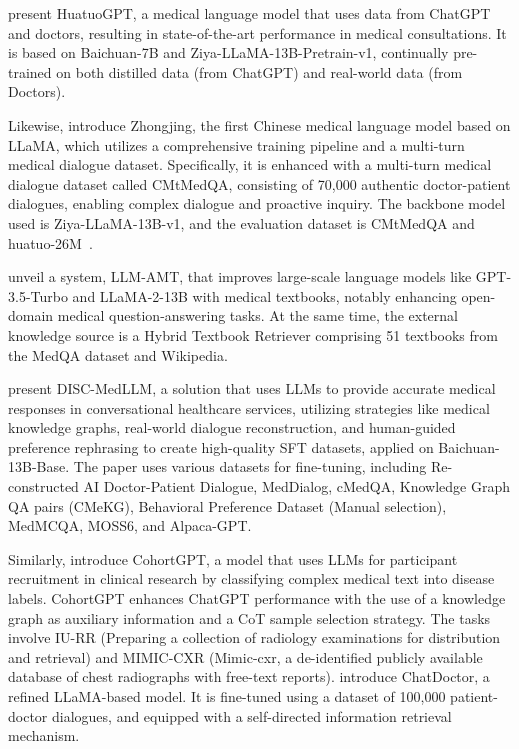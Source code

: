 \citet{zhang2023huatuogpt} present HuatuoGPT, a medical language model that uses data from ChatGPT and doctors, resulting in state-of-the-art performance in medical consultations. It is based on Baichuan-7B and Ziya-LLaMA-13B-Pretrain-v1, continually pre-trained on both distilled data (from ChatGPT) and real-world data (from Doctors). 

Likewise, \citet{yang2023zhongjing} introduce Zhongjing, the first Chinese medical language model based on LLaMA, which utilizes a comprehensive training pipeline and a multi-turn medical dialogue dataset. Specifically, it is enhanced with a multi-turn medical dialogue dataset called CMtMedQA, consisting of 70,000 authentic doctor-patient dialogues, enabling complex dialogue and proactive inquiry. The backbone model used is Ziya-LLaMA-13B-v1, and the evaluation dataset is CMtMedQA and huatuo-26M~\citep{li2023huatuo}. 

\citet{wang2023augmenting}
unveil a system, LLM-AMT, that improves large-scale language models like GPT-3.5-Turbo and LLaMA-2-13B  with medical textbooks, notably enhancing open-domain medical question-answering tasks. At the same time, the external knowledge source is a Hybrid Textbook Retriever comprising 51 textbooks from the MedQA dataset and Wikipedia.


\citet{bao2023disc} present DISC-MedLLM, a solution that uses LLMs to provide accurate medical responses in conversational healthcare services, utilizing strategies like medical knowledge graphs, real-world dialogue reconstruction, and human-guided preference rephrasing to create high-quality SFT datasets, applied on Baichuan-13B-Base. The paper uses various datasets for fine-tuning, including Re-constructed AI Doctor-Patient Dialogue, MedDialog, cMedQA, Knowledge Graph QA pairs (CMeKG), Behavioral Preference Dataset (Manual selection), MedMCQA, MOSS6, and Alpaca-GPT.

Similarly, \citet{guan2023cohortgpt} introduce CohortGPT, a model that uses LLMs for participant recruitment in clinical research by classifying complex medical text into disease labels. CohortGPT enhances ChatGPT performance with the use of a knowledge graph as auxiliary information and a CoT sample selection strategy. The tasks involve IU-RR (Preparing a collection of radiology examinations for distribution and retrieval) and MIMIC-CXR (Mimic-cxr, a de-identified publicly available database of chest radiographs with free-text reports). \citet{li2023chatdoctor} introduce ChatDoctor, a refined LLaMA-based model. It is fine-tuned using a dataset of 100,000 patient-doctor dialogues, and equipped with a self-directed information retrieval mechanism.

